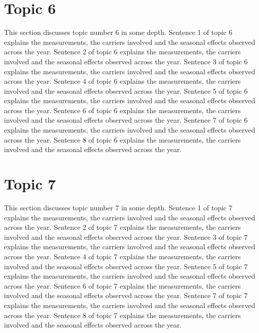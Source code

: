 \documentclass[twocolumn,10pt]{article}
\begin{document}
\section{Topic 6}
This section discusses topic number 6 in some depth. Sentence 1 of topic 6 explains the measurements, the carriers involved and the seasonal effects observed across the year. Sentence 2 of topic 6 explains the measurements, the carriers involved and the seasonal effects observed across the year. Sentence 3 of topic 6 explains the measurements, the carriers involved and the seasonal effects observed across the year. Sentence 4 of topic 6 explains the measurements, the carriers involved and the seasonal effects observed across the year. Sentence 5 of topic 6 explains the measurements, the carriers involved and the seasonal effects observed across the year. Sentence 6 of topic 6 explains the measurements, the carriers involved and the seasonal effects observed across the year. Sentence 7 of topic 6 explains the measurements, the carriers involved and the seasonal effects observed across the year. Sentence 8 of topic 6 explains the measurements, the carriers involved and the seasonal effects observed across the year.
\section{Topic 7}
This section discusses topic number 7 in some depth. Sentence 1 of topic 7 explains the measurements, the carriers involved and the seasonal effects observed across the year. Sentence 2 of topic 7 explains the measurements, the carriers involved and the seasonal effects observed across the year. Sentence 3 of topic 7 explains the measurements, the carriers involved and the seasonal effects observed across the year. Sentence 4 of topic 7 explains the measurements, the carriers involved and the seasonal effects observed across the year. Sentence 5 of topic 7 explains the measurements, the carriers involved and the seasonal effects observed across the year. Sentence 6 of topic 7 explains the measurements, the carriers involved and the seasonal effects observed across the year. Sentence 7 of topic 7 explains the measurements, the carriers involved and the seasonal effects observed across the year. Sentence 8 of topic 7 explains the measurements, the carriers involved and the seasonal effects observed across the year.
\end{document}
